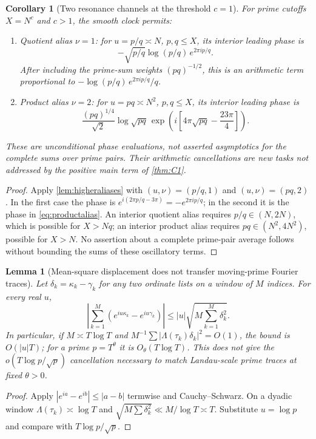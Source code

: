 \documentclass[11pt,reqno]{amsart}
\numberwithin{equation}{section}
\newtheorem{lemma}[theorem]{Lemma}
\newtheorem{corollary}[theorem]{Corollary}
\begin{document}
\begin{corollary}[Two resonance channels at the threshold $c=1$]
\label{cor:resonancechannels}
For prime cutoffs $X=N^c$ and $c>1$, the smooth clock permits:
\begin{enumerate}[label=(\alph*)]
\item \emph{Quotient alias $\nu=1$:} for $u=p/q\asymp N$,
$p,q\le X$, its interior leading phase is
\begin{equation}\label{eq:quotientalias}
-\sqrt{p/q}\log(p/q)\,e^{2\pi i p/q}.
\end{equation}
After including the prime-sum weights $(pq)^{-1/2}$, this
is an arithmetic term proportional to
$-\log(p/q)\,e^{2\pi i p/q}/q$.
\item \emph{Product alias $\nu=2$:} for $u=pq\asymp N^2$,
$p,q\le X$, its interior leading phase is
\begin{equation}\label{eq:productalias}
\frac{(pq)^{1/4}}{\sqrt2}\log\sqrt{pq}\,
\exp\!\left(i\left[4\pi\sqrt{pq}-\frac{23\pi}4\right]\right).
\end{equation}
\end{enumerate}
These are unconditional phase evaluations, \emph{not} asserted
asymptotics for the complete sums over prime pairs. Their
arithmetic cancellations are new tasks not addressed by the
positive main term of \cref{thm:C1}.
\end{corollary}
\begin{proof}
Apply \cref{lem:higheraliases} with $(u,\nu)=(p/q,1)$
and $(u,\nu)=(pq,2)$. In the first case the phase is
$e^{i(2\pi p/q-3\pi)}=-e^{2\pi i p/q}$; in the
second it is the phase in \eqref{eq:productalias}.
An interior quotient alias requires $p/q\in(N,2N)$,
which is possible for $X>Nq$; an interior product alias
requires $pq\in(N^2,4N^2)$, possible for $X>N$.
No assertion about a complete prime-pair average follows
without bounding the sums of these oscillatory terms.
\end{proof}

\begin{lemma}[Mean-square displacement does not transfer moving-prime
Fourier traces]\label{lem:phaseamplification}
Let $\delta_k=\kappa_k-\gamma_k$ for any two ordinate lists on
a window of $M$ indices. For every real $u$,
\begin{equation}\label{eq:phaseamplification}
\left|\sum_{k=1}^M(e^{iu\kappa_k}-e^{iu\gamma_k})\right|
\le |u|\sqrt{M\sum_{k=1}^M\delta_k^2}.
\end{equation}
In particular, if $M\asymp T\log T$ and
$M^{-1}\sum|\Lambda(\tau_k)\delta_k|^2=O(1)$,
the bound is $O(|u|T)$; for a prime $p=T^\theta$ it is
$O_\theta(T\log T)$. This does not give the
$o(T\log p/\sqrt p)$ cancellation necessary to match
Landau-scale prime traces at fixed $\theta>0$.
\end{lemma}
\begin{proof}
Apply $|e^{ia}-e^{ib}|\le|a-b|$ termwise and
Cauchy--Schwarz. On a dyadic window
$\Lambda(\tau_k)\asymp\log T$ and
$\sqrt{M\sum\delta_k^2}\ll M/\log T\asymp T$.
Substitute $u=\log p$ and compare with
$T\log p/\sqrt p$.
\end{proof}
\end{document}
